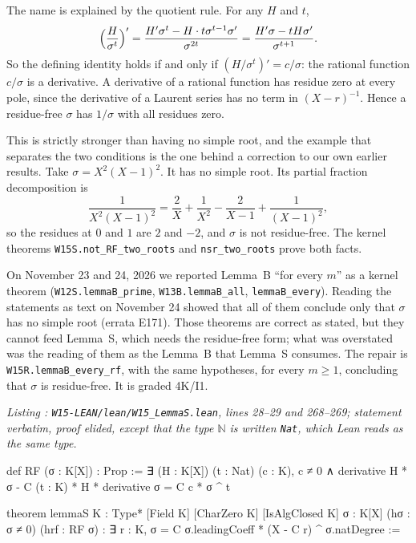 \documentclass[a4paper,11pt]{article}
\newcounter{leanlisting}
\newenvironment{leanlisting}[2]{%
  \refstepcounter{leanlisting}\label{#2}%
  \begin{center}\textit{\small\color{inksecondary}Listing \theleanlisting: #1}\end{center}%
  \Verbatim[breaklines=true,breakanywhere=true,fontsize=\footnotesize,frame=single,framesep=4pt,rulecolor=\color{borderstrong},fillcolor=\color{bgsubtle}]%
}{%
  \endVerbatim%
}
\theoremstyle{jsplain}
\theoremstyle{jsdef}
\theoremstyle{jsrem}
\begin{document}
The name is explained by the quotient rule. For any $H$ and $t$,
\[
\Bigl(\frac{H}{\sigma^t}\Bigr)'=\frac{H'\sigma^t-H\cdot t\sigma^{t-1}\sigma'}{\sigma^{2t}}=\frac{H'\sigma-tH\sigma'}{\sigma^{t+1}} .
\]
So the defining identity holds if and only if $(H/\sigma^t)'=c/\sigma$: the rational function $c/\sigma$ is a derivative. A derivative of a rational function has residue zero at every pole, since the derivative of a Laurent series has no term in $(X-r)^{-1}$. Hence a residue-free $\sigma$ has $1/\sigma$ with all residues zero.

This is strictly stronger than having no simple root, and the example that separates the two conditions is the one behind a correction to our own earlier results. Take $\sigma=X^2(X-1)^2$. It has no simple root. Its partial fraction decomposition is
\[
\frac{1}{X^2(X-1)^2}=\frac{2}{X}+\frac{1}{X^2}-\frac{2}{X-1}+\frac{1}{(X-1)^2},
\]
so the residues at $0$ and $1$ are $2$ and $-2$, and $\sigma$ is not residue-free. The kernel theorems \texttt{W15S.\allowbreak{}not\_\allowbreak{}RF\_\allowbreak{}two\_\allowbreak{}roots} and \texttt{nsr\_\allowbreak{}two\_\allowbreak{}roots} prove both facts.

On November 23 and 24, 2026 we reported Lemma~B ``for every $m$'' as a kernel theorem (\texttt{W12S.\allowbreak{}lemmaB\_\allowbreak{}prime}, \texttt{W13B.\allowbreak{}lemmaB\_\allowbreak{}all}, \texttt{lemmaB\_\allowbreak{}every}). Reading the statements as text on November 24 showed that all of them conclude only that $\sigma$ has no simple root (errata E171). Those theorems are correct as stated, but they cannot feed Lemma~S, which needs the residue-free form; what was overstated was the reading of them as the Lemma~B that Lemma~S consumes. The repair is \texttt{W15R.\allowbreak{}lemmaB\_\allowbreak{}every\_\allowbreak{}rf}, with the same hypotheses, for every $m\ge1$, concluding that $\sigma$ is residue-free. It is graded 4K/I1.

\begin{leanlisting}{\texttt{W15-LEAN/lean/W15\_LemmaS.lean}, lines 28--29 and 268--269; statement verbatim, proof elided, except that the type $\mathbb N$ is written \texttt{Nat}, which Lean reads as the same type.}{rp:lst:lemmaS}
def RF (σ : K[X]) : Prop :=
  ∃ (H : K[X]) (t : Nat) (c : K), c ≠ 0 ∧ derivative H * σ - C (t : K) * H * derivative σ = C c * σ ^ t

theorem lemmaS {K : Type*} [Field K] [CharZero K] [IsAlgClosed K] {σ : K[X]} (hσ : σ ≠ 0)
    (hrf : RF σ) : ∃ r : K, σ = C σ.leadingCoeff * (X - C r) ^ σ.natDegree :=
\end{leanlisting}
\end{document}
